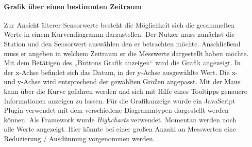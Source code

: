 \paragraph{Grafik über einen bestimmten Zeitraum} Zur Ansicht älterer Sensorwerte besteht die Möglichkeit sich die gesammelten Werte in einem Kurvendiagramm darzustellen. Der Nutzer muss zunächst die Station und den Sensorwert auswählen den er betrachten möchte. Anschließend muss er angeben in welchem Zeitraum er die Messwerte dargestellt haben möchte. Mit dem Betätigen des „Buttons Grafik anzeigen“ wird die Grafik angezeigt. In der x-Achse befindet sich das Datum, in der y-Achse ausgewählte Wert. Die x- und y-Achse wird entsprechend der gewählten Größen angepasst. Mit der Maus kann über die Kurve gefahren werden und sich mit Hilfe eines Tooltipps genauere Informationen anzeigen zu lassen. Für die Grafikanzeige wurde ein JavaScript Plugin verwendet mit dem verschiedene Diagrammtypen dargestellt werden können. Als Framework wurde \textit{Highcharts} verwendet. Momentan werden noch alle Werte angezeigt. Hier könnte bei einer großen Anzahl an Messwerten eine Reduzierung / Ausdünnung vorgenommen werden.
